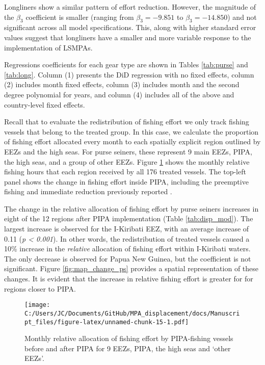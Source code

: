 \documentclass[11pt,]{article}
\begin{document}
Longliners show a similar pattern of effort reduction. However, the
magnitude of the \(\beta_3\) coefficient is smaller (ranging from
\(\beta_3 = -9.851\) to \(\beta_3 = -14.850\)) and not significant
across all model specifications. This, along with higher standard error
values suggest that longliners have a smaller and more variable response
to the implementation of LSMPAs.

Regressions coefficients for each gear type are shown in Tables
\ref{tab:purse} and \ref{tab:long}. Column (1) presents the DiD
regression with no fixed effects, column (2) includes month fixed
effects, column (3) includes month and the second degree polynomial for
years, and column (4) includes all of the above and country-level fixed
effects.

Recall that to evaluate the redistribution of fishing effort we only
track fishing vessels that belong to the treated group. In this case, we
calculate the proportion of fishing effort allocated every month to each
spatially explicit region outlined by EEZs and the high seas. For purse
seiners, these represent 9 main EEZs, PIPA, the high seas, and a group
of other EEZs. Figure \ref{fig:redist_trend_ps} shows the monthly
relative fishing hours that each region received by all 176 treated
vessels. The top-left panel shows the change in fishing effort inside
PIPA, including the preemptive fishing and immediate reduction
previously reported \citep{mcdermott_2018}.

The change in the relative allocation of fishing effort by purse seiners
increases in eight of the 12 regions after PIPA implementation (Table
\ref{tab:disp_mod}). The largest increase is observed for the I-Kiribati
EEZ, with an average increase of 0.11 (\emph{p \textless{} 0.001}). In
other words, the redistribution of treated vessels caused a 10\%
increase in the \emph{relative} allocation of fishing effort within
I-Kiribati waters. The only decrease is observed for Papua New Guinea,
but the coefficient is not significant. Figure \ref{fig:map_change_ps}
provides a spatial representation of these changes. It is evident that
the increase in relative fishing effort is greater for for regions
closer to PIPA.

\begin{figure}
\centering
\texttt{[image: C:/Users/JC/Documents/GitHub/MPA\_displacement/docs/Manuscript\_files/figure-latex/unnamed-chunk-15-1.pdf]}
\caption{\label{fig:unnamed-chunk-15}\label{fig:redist_trend_ps}Monthly
relative allocation of fishing effort by PIPA-fishing vessels before and
after PIPA for 9 EEZs, PIPA, the high seas and `other EEZs'.}
\end{figure}
\end{document}
